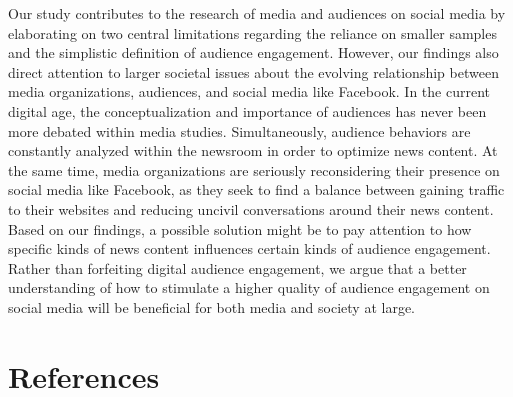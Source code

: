 \documentclass[
]{article}
\begin{document}
Our study contributes to the research of media and audiences on social
media by elaborating on two central limitations regarding the reliance
on smaller samples and the simplistic definition of audience engagement.
However, our findings also direct attention to larger societal issues
about the evolving relationship between media organizations, audiences,
and social media like Facebook. In the current digital age, the
conceptualization and importance of audiences has never been more
debated within media studies. Simultaneously, audience behaviors are
constantly analyzed within the newsroom in order to optimize news
content. At the same time, media organizations are seriously
reconsidering their presence on social media like Facebook, as they seek
to find a balance between gaining traffic to their websites and reducing
uncivil conversations around their news content. Based on our findings,
a possible solution might be to pay attention to how specific kinds of
news content influences certain kinds of audience engagement. Rather
than forfeiting digital audience engagement, we argue that a better
understanding of how to stimulate a higher quality of audience
engagement on social media will be beneficial for both media and society
at large.

\pagebreak

\hypertarget{references}{%
\section{References}\label{references}}
\end{document}

